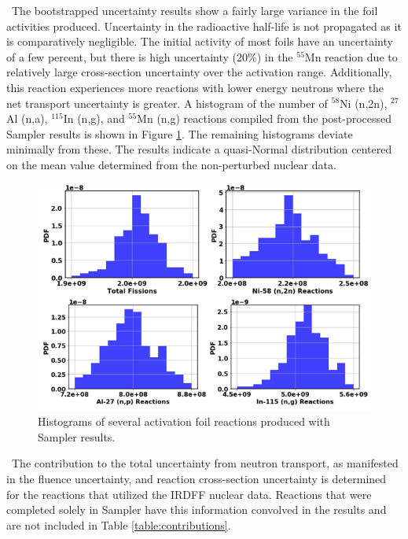 \ The bootstrapped uncertainty results show a fairly large variance in the foil activities produced. 
Uncertainty in the radioactive half-life is not propagated as it is comparatively negligible. 
The initial activity of most foils have an uncertainty of a few percent, but there is high uncertainty (20\%) in the $\mathrm{^{55}}$Mn reaction due to relatively large cross-section uncertainty over the activation range. 
Additionally, this reaction experiences more reactions with lower energy neutrons where the net transport uncertainty is greater. 
A histogram of the number of $\mathrm{^{58}}$Ni (n,2n), $\mathrm{^{27}}$Al (n,a), $\mathrm{^{115}}$In (n,g), and  $\mathrm{^{55}}$Mn (n,g) reactions compiled from the post-processed Sampler results is shown in Figure \ref{fig:act_histo}. 
The remaining histograms deviate minimally from these.
The results indicate a quasi-Normal distribution centered on the mean value determined from the non-perturbed nuclear data. 

\begin{figure}[!htb]
	\centering
	\includegraphics[width=15cm]{Figures/Chapter4/NeutronFlux/Foil_Histo.png}
	\caption{Histograms of several activation foil reactions produced with Sampler results.}
	\label{fig:act_histo}
\end{figure}


\ The contribution to the total uncertainty from neutron transport, as manifested in the fluence uncertainty, and reaction cross-section uncertainty is determined for the reactions that utilized the IRDFF nuclear data. 
Reactions that were completed solely in Sampler have this information convolved in the results and are not included in Table \ref{table:contributions}. 

